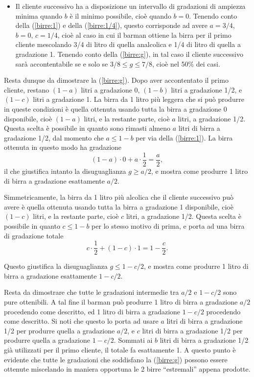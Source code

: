 {\begin{itemize}
	\item  Il cliente successivo ha a disposizione un intervallo di gradazioni di ampiezza minima quando $b$ è il minimo possibile, cioè quando $b=0$. Tenendo conto della
	(\ref{birre:1}) e della (\ref{birre:1/4}), questo corrisponde ad
	avere $a=3/4$, $b=0$, $c=1/4$, cioè al caso in cui il barman ottiene la birra per il primo cliente mescolando 3/4 di litro di quella analcolica e 1/4 di litro di quella a gradazione 1.
	Tenendo conto della (\ref{birre:g}), in tal caso il cliente
	successivo sarà accontentabile se e solo se $3/8\leq g\leq
	7/8$, cioè nel 50\% dei casi.
\end{itemize}

Resta dunque da dimostrare la (\ref{birre:g}).  Dopo aver accontentato
il primo cliente, restano $(1-a)$ litri a gradazione 0, $(1-b)$ litri a gradazione 1/2, e $(1-c)$ litri a gradazione 1.  La birra da 1 litro più leggera che si può produrre in queste condizioni è quella ottenuta usando tutta la birra a gradazione 0 disponibile, cioè $(1-a)$ litri, e la restante parte, cioè $a$ litri, a gradazione 1/2.  Questa scelta è possibile in quanto sono rimasti almeno $a$ litri di birra a gradazione 1/2, dal momento che $a\leq 1-b$
per via della (\ref{birre:1}).  La birra ottenuta in questo modo ha
gradazione
$$(1-a)\cdot 0+a\cdot \frac{1}{2}=\frac{a}{2},$$
il che giustifica intanto la disuguaglianza $g\geq a/2$, e mostra come produrre 1 litro di birra a gradazione esattamente $a/2$.

Simmetricamente, la birra da 1 litro più alcolica che il cliente successivo può avere è quella ottenuta usando tutta la birra a gradazione 1 disponibile, cioè $(1-c)$ litri, e la restante parte, cioè $c$ litri, a gradazione 1/2.  Questa scelta è possibile in quanto $c\leq 1-b$ per lo stesso motivo di prima, e porta ad una birra di gradazione totale
$$c\cdot\frac{1}{2}+(1-c)\cdot 1=1-\frac{c}{2}.$$

Questo giustifica la disuguaglianza $g\leq 1-c/2$, e mostra come produrre 1 litro di birra a gradazione esattamente $1-c/2$.

Resta da dimostrare che tutte le gradazioni intermedie tra $a/2$ e $1-c/2$ sono pure ottenibili.  A tal fine il barman può produrre 1 litro di birra a gradazione $a/2$ procedendo come descritto, ed 1 litro di birra a gradazione $1-c/2$ procedendo come descritto.  Si noti che questo lo porta ad usare $a$ litri di birra a gradazione 1/2 per produrre quella a gradazione $a/2$, e $c$ litri di birra a gradazione 1/2 per produrre quella a gradazione $1-c/2$.  Sommati ai $b$ litri di birra a gradazione 1/2 già utilizzati per il primo cliente, il totale fa esattamente 1.  A questo punto è evidente
che tutte le gradazioni che soddisfano la (\ref{birre:g}) possono
essere ottenute miscelando in maniera opportuna le 2 birre
``estremali'' appena prodotte.  }

